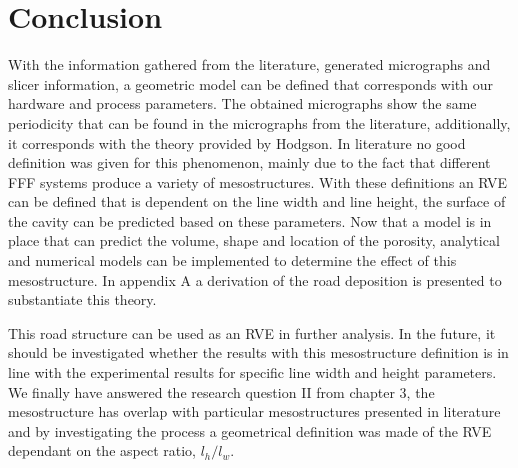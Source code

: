 \section{Conclusion}
With the information gathered from the literature, generated micrographs and slicer information, a geometric model can be defined that corresponds with our hardware and process parameters. The obtained micrographs show the same periodicity that can be found in the micrographs from the literature, additionally, it corresponds with the theory provided by Hodgson. In literature no good definition was given for this phenomenon, mainly due to the fact that different FFF systems produce a variety of mesostructures. 
With these definitions an RVE can be defined that is dependent on the line width and line height, the surface of the cavity can be predicted based on these parameters. Now that a model is in place that can predict the volume, shape and location of the porosity, analytical and numerical models can be implemented to determine the effect of this mesostructure. 
In appendix A a derivation of the road deposition is presented to substantiate this theory. 

This road structure can be used as an RVE in further analysis. In the future, it should be investigated whether the results with this mesostructure definition is in line with the experimental results for specific line width and height parameters.
We finally have answered the research question II from chapter 3, the mesostructure has overlap with particular mesostructures presented in literature and by investigating the process a geometrical definition was made of the RVE dependant on the aspect ratio, $l_h/l_w$.




